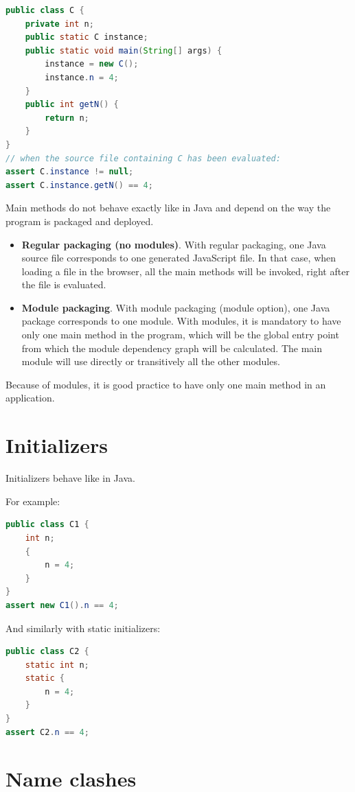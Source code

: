 \documentclass[a4paper]{report}
\begin{document}
\begin{lstlisting}[language=Java]
public class C {
	private int n;
	public static C instance;
	public static void main(String[] args) {
		instance = new C();
		instance.n = 4;
	}
	public int getN() {
		return n;
	}
}
// when the source file containing C has been evaluated:
assert C.instance != null;
assert C.instance.getN() == 4;
\end{lstlisting}

Main methods do not behave exactly like in Java and depend on the way the program is packaged and deployed. 

\begin{itemize}
\item \textbf{Regular packaging (no modules)}. With regular packaging, one Java source file corresponds to one generated JavaScript file. In that case, when loading a file in the browser, all the main methods will be invoked, right after the file is evaluated. 
\item \textbf{Module packaging}. With module packaging (module option), one Java package corresponds to one module. With modules, it is mandatory to have only one main method in the program, which will be the global entry point from which the module dependency graph will be calculated. The main module will use directly or transitively all the other modules.
\end{itemize}

Because of modules, it is good practice to have only one main method in an application.

\section{Initializers}

Initializers behave like in Java.

\noindent
For example:

\begin{lstlisting}[language=Java]
public class C1 {
	int n;
	{
		n = 4;
	}
}
assert new C1().n == 4;
\end{lstlisting}

\noindent
And similarly with static initializers:

\begin{lstlisting}[language=Java]
public class C2 {
	static int n;
	static {
		n = 4;
	}
}
assert C2.n == 4;
\end{lstlisting}


\section{Name clashes}
\end{document}

